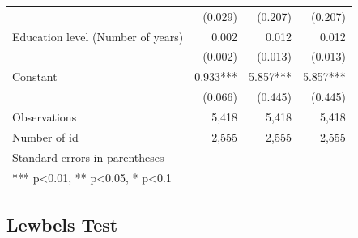 \documentclass[
]{article}
\begin{document}
\begin{longtable}[t]{lrrr}
 & (0.029) & (0.207) & (0.207)\\
Education level (Number of years) & 0.002 & 0.012 & 0.012\\
 & (0.002) & (0.013) & (0.013)\\
Constant & 0.933*** & 5.857*** & 5.857***\\
 & (0.066) & (0.445) & (0.445)\\
Observations & 5,418 & 5,418 & 5,418\\
Number of id & 2,555 & 2,555 & 2,555\\
Standard errors in parentheses &  &  & \\
*** p<0.01, ** p<0.05, * p<0.1 &  &  & \\*
\end{longtable}
\endgroup{}
\newpage

\hypertarget{lewbels-test}{%
\subsection{Lewbels Test}\label{lewbels-test}}

\begingroup\fontsize{7}{9}\selectfont
\end{document}
